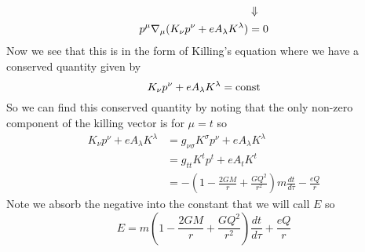 \documentclass[11pt]{article}
\numberwithin{equation}{section}
\begin{document}
\begin{enumerate}[(a)]
\begin{align*}
&\Downarrow\\
p^{\mu}\bold\nabla_{\mu}(K_{\nu}p^{\nu}+eA_{\lambda}K^{\lambda}) &= 0
\end{align*}
Now we see that this is in the form of Killing's equation where we have a conserved quantity given by
$$K_{\nu}p^{\nu}+eA_{\lambda}K^{\lambda} = \textnormal{const}$$
So we can find this conserved quantity by noting that the only non-zero component of the killing vector is for $\mu=t$ so
\begin{align*}
K_{\nu}p^{\nu}+eA_{\lambda}K^{\lambda} &= g_{\nu\sigma}K^{\sigma}p^{\nu} + eA_{\lambda}K^{\lambda}\\
&= g_{tt}K^{t}p^{t} + eA_{t}K^{t}\\
&= -\left(1-\frac{2GM}{r} + \frac{GQ^2}{r^2}\right)m\frac{dt}{d\tau} - \frac{eQ}{r}
\end{align*}
Note we absorb the negative into the constant that we will call $E$ so 
$$E =  m\left(1-\frac{2GM}{r} + \frac{GQ^2}{r^2}\right)\frac{dt}{d\tau} + \frac{eQ}{r}$$
\end{enumerate}
 
\end{document}
